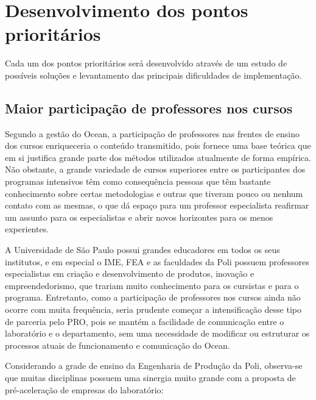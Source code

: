 \section{Desenvolvimento dos pontos prioritários}

Cada um dos pontos prioritários será desenvolvido através de um estudo de possíveis soluções e levantamento das principais dificuldades de implementação.

\subsection{Maior participação de professores nos cursos}

Segundo a gestão do Ocean, a participação de professores nas frentes de ensino dos cursos enriqueceria o conteúdo transmitido, pois fornece uma base teórica que em si justifica grande parte dos métodos utilizados atualmente de forma empírica. Não obstante, a grande variedade de cursos superiores entre os participantes dos programas intensivos têm como consequência pessoas que têm bastante conhecimento sobre certas metodologias e outras que tiveram pouco ou nenhum  contato com as mesmas, o que dá espaço para um professor especialista reafirmar um assunto para os especialistas e abrir novos horizontes para os menos experientes. 

A Universidade de São Paulo possui grandes educadores em todos os seus institutos, e em especial o IME, FEA e as faculdades da Poli possuem professores especialistas em criação e desenvolvimento de produtos, inovação e empreendedorismo, que trariam muito conhecimento para os cursistas e para o programa. Entretanto, como a participação de professores nos cursos ainda não ocorre com muita frequência, seria prudente começar a intensificação desse tipo de parceria pelo PRO, pois se mantém a facilidade de comunicação entre o laboratório e o departamento, sem uma necessidade de modificar ou estruturar os processos atuais de funcionamento e comunicação do Ocean.

Considerando a grade de ensino da Engenharia de Produção da Poli, observa-se que muitas disciplinas possuem uma sinergia muito grande com a proposta de pré-aceleração de empresas do laboratório: 

